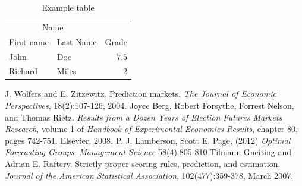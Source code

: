 \documentclass[twoside,twocolumn]{article}
\begin{document}
\blindtext %

\begin{table}
\caption{Example table}
\centering
\begin{tabular}{llr}
\toprule
\multicolumn{2}{c}{Name} \\
\cmidrule(r){1-2}
First name & Last Name & Grade \\
\midrule
John & Doe & $7.5$ \\
Richard & Miles & $2$ \\
\bottomrule
\end{tabular}
\end{table}


\begin{thebibliography}{99} %

J. Wolfers and E. Zitzewitz. Prediction markets. \textit{The Journal of Economic Perspectives},
18(2):107-126, 2004.
 Joyce Berg, Robert Forsythe, Forrest Nelson, and Thomas Rietz. \textit{Results from
a Dozen Years of Election Futures Markets Research}, volume 1 of \textit{Handbook of
Experimental Economics Results}, chapter 80, pages 742-751. Elsevier, 2008.
P. J. Lamberson, Scott E. Page, (2012) \textit{Optimal Forecasting Groups}. \textit{Management Science} 58(4):805-810
Tilmann Gneiting and Adrian E. Raftery. Strictly proper scoring rules, prediction,
and estimation. \textit{Journal of the American Statistical Association}, 102(477):359-378,
March 2007.

 
\end{thebibliography}

\end{document}
